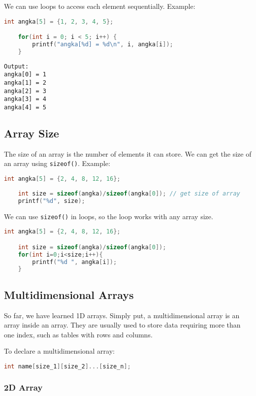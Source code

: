 We can use loops to access each element sequentially.
Example:
\begin{lstlisting}[language=c]
	int angka[5] = {1, 2, 3, 4, 5};

	for(int i = 0; i < 5; i++) {
		printf("angka[%d] = %d\n", i, angka[i]);
	}
\end{lstlisting}
\begin{verbatim}
Output:
angka[0] = 1
angka[1] = 2
angka[2] = 3
angka[3] = 4
angka[4] = 5
\end{verbatim}

\subsection{Array Size}

The size of an array is the number of elements it can store.  
We can get the size of an array using \verb|sizeof()|.
Example:
\begin{lstlisting}[language=c]
	int angka[5] = {2, 4, 8, 12, 16};
	
	int size = sizeof(angka)/sizeof(angka[0]); // get size of array
	printf("%d", size);
\end{lstlisting}

We can use \verb|sizeof()| in loops, so the loop works with any array size.

\begin{lstlisting}[language=c]
	int angka[5] = {2, 4, 8, 12, 16};

	int size = sizeof(angka)/sizeof(angka[0]);
	for(int i=0;i<size;i++){
		printf("%d ", angka[i]);
	}
\end{lstlisting}

\subsection{Multidimensional Arrays}

So far, we have learned 1D arrays.  
Simply put, a multidimensional array is an array inside an array.  
They are usually used to store data requiring more than one index, such as tables with rows and columns.

To declare a multidimensional array:
{
\captionsetup[lstlisting]{labelformat=empty, justification=raggedright, singlelinecheck=false}
\begin{lstlisting}[language=c, caption={Syntax}]
	int name[size_1][size_2]...[size_n];
\end{lstlisting}
}

\subsubsection{2D Array}

